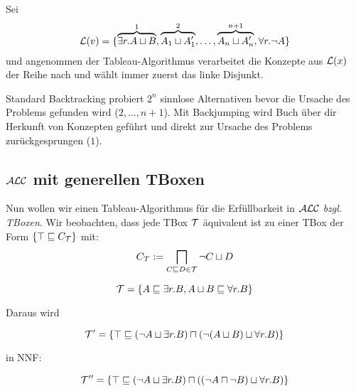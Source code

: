 \begin{tafel}
    Sei 
    \begin{align*}
    \mathcal{L}(v) = \{\overbrace{\exists r.A \sqcup B}^1, \overbrace{A_1 \sqcup A_1'}^2, \ldots, \overbrace{A_n \sqcup A_n'}^{n + 1}, \forall r.\neg A\}
    \end{align*}
    und angenommen der Tableau-Algorithmus verarbeitet die Konzepte aus $\mathcal{L}(x)$ der Reihe nach und wählt immer zuerst das linke Disjunkt.
    \begin{center}
    \end{center}
    Standard Backtracking probiert $2^n$ sinnlose Alternativen bevor die Ursache des Problems gefunden wird ($2, \ldots, n + 1$). Mit Backjumping wird Buch über dir Herkunft von Konzepten geführt und direkt zur Ursache des Problems zurückgesprungen ($1$).
\end{tafel}

\subsection{\texorpdfstring{$\mathcal{A}\mathcal{L}\mathcal{C}$}{ALC} mit generellen TBoxen}\label{alc-mit-generellen-tboxen}

Nun wollen wir einen Tableau-Algorithmus für die Erfüllbarkeit in $\mathcal{A}\mathcal{L}\mathcal{C}$  \emph{bzgl. TBoxen}. Wir beobachten, dass jede TBox $\mathcal{T}$ äquivalent ist zu einer TBox der Form
$\left\{ \top \sqsubseteq C_{\MT} \right\}$ mit: 
\begin{align*}
C_{\mathcal{T}} := \bigsqcap_{C \sqsubseteq D \in \mathcal{T}}\neg C \sqcup D
\end{align*}

\begin{tafel}

$$\mathcal{T} = \{A \sqsubseteq \exists r.B, A \sqcup B \sqsubseteq \forall r.B\}$$

Daraus wird

$$\mathcal{T}' = \{\top \sqsubseteq (\neg A \sqcup \exists r.B) \sqcap (\neg (A \sqcup B) \sqcup \forall r.B)\}$$

in NNF:

$$\mathcal{T}'' = \{\top \sqsubseteq (\neg A \sqcup \exists r.B) \sqcap ((\neg A \sqcap \neg B) \sqcup \forall r.B)\}$$
\end{tafel}

